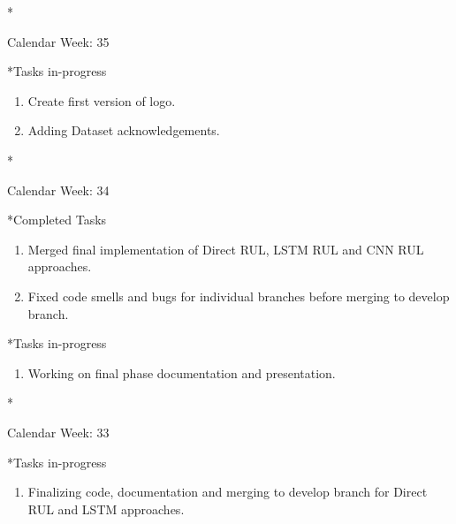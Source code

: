 \documentclass[11pt,a4paper]{article}
\begin{document}
\newpage
\begin{section}*{Calendar Week: 35 \hfill \date{3 September, 2021}}
 \begin{refsection}
     \begin{subsection}*{Tasks in-progress}
         \begin{enumerate}
             \item Create first version of logo.
             \item Adding Dataset acknowledgements.
         \end{enumerate}
     \end{subsection}
 \end{refsection}
\end{section}

\newpage
\begin{section}*{Calendar Week: 34  \hfill \date{27 August, 2021}}
 \begin{refsection}
     \begin{subsection}*{Completed Tasks}
         \begin{enumerate}
             \item Merged final implementation of Direct RUL, LSTM RUL and CNN RUL approaches.
             \item Fixed code smells and bugs for individual branches before merging to develop branch.
         \end{enumerate}
     \end{subsection}
     \begin{subsection}*{Tasks in-progress}
         \begin{enumerate}
             \item Working on final phase documentation and presentation.
         \end{enumerate}
     \end{subsection}
 \end{refsection}
\end{section}
\newpage
\begin{section}*{Calendar Week: 33  \hfill \date{20 August, 2021}}
 \begin{refsection}
     \begin{subsection}*{Tasks in-progress}
         \begin{enumerate}
             \item Finalizing code, documentation and merging to develop branch for Direct RUL and LSTM approaches.
         \end{enumerate}
     \end{subsection}
 \end{refsection}
\end{section}
\end{document}
